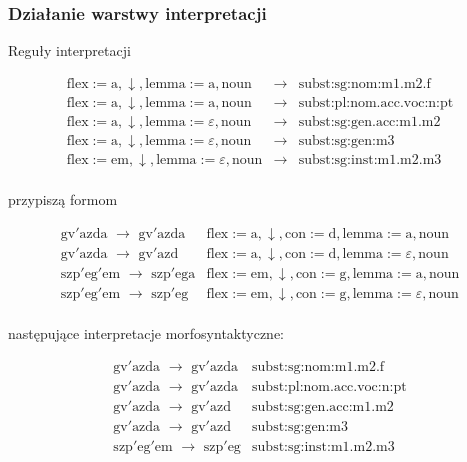 \documentclass{beamer}
\begin{document}
\begin{frame}
\frametitle{Działanie warstwy interpretacji}
Reguły interpretacji
\begin{scriptsize}\[
\begin{array}{lll}
\text{flex}:=\text{a}, \downarrow, \text{lemma}:=\text{a}, \text{noun} & \rightarrow & \text{subst:sg:nom:m1.m2.f}\\
\text{flex}:=\text{a}, \downarrow, \text{lemma}:=\text{a}, \text{noun} & \rightarrow & \text{subst:pl:nom.acc.voc:n:pt}\\
\text{flex}:=\text{a}, \downarrow, \text{lemma}:=\text{$\varepsilon$}, \text{noun} & \rightarrow & \text{subst:sg:gen.acc:m1.m2}\\
\text{flex}:=\text{a}, \downarrow, \text{lemma}:=\text{$\varepsilon$}, \text{noun} & \rightarrow & \text{subst:sg:gen:m3}\\
\text{flex}:=\text{em}, \downarrow, \text{lemma}:=\text{$\varepsilon$}, \text{noun} & \rightarrow & \text{subst:sg:inst:m1.m2.m3}\\
\end{array} 
\]\end{scriptsize}
przypiszą formom
\begin{scriptsize}\[
\begin{array}{ll}
\text{gv$'$azda $\rightarrow$ gv$'$azda} & \text{flex}:=\text{a}, \downarrow, \text{con}:=\text{d}, \text{lemma}:=\text{a}, \text{noun}\\
\text{gv$'$azda $\rightarrow$ gv$'$azd} & \text{flex}:=\text{a}, \downarrow, \text{con}:=\text{d}, \text{lemma}:=\text{$\varepsilon$}, \text{noun}\\
\text{szp$'$eg$'$em $\rightarrow$ szp$'$ega} & \text{flex}:=\text{em}, \downarrow, \text{con}:=\text{g}, \text{lemma}:=\text{a}, \text{noun}\\
\text{szp$'$eg$'$em $\rightarrow$ szp$'$eg} & \text{flex}:=\text{em}, \downarrow, \text{con}:=\text{g}, \text{lemma}:=\text{$\varepsilon$}, \text{noun}\\
\end{array}
\]\end{scriptsize}
następujące interpretacje morfosyntaktyczne:
\begin{scriptsize}\[
\begin{array}{ll}
\text{gv$'$azda $\rightarrow$ gv$'$azda} & \text{subst:sg:nom:m1.m2.f}\\
\text{gv$'$azda $\rightarrow$ gv$'$azda} & \text{subst:pl:nom.acc.voc:n:pt}\\
\text{gv$'$azda $\rightarrow$ gv$'$azd} & \text{subst:sg:gen.acc:m1.m2}\\
\text{gv$'$azda $\rightarrow$ gv$'$azd} & \text{subst:sg:gen:m3}\\
\text{szp$'$eg$'$em $\rightarrow$ szp$'$eg} & \text{subst:sg:inst:m1.m2.m3}\\
\end{array}
\]\end{scriptsize}


\end{frame}
\end{document}
